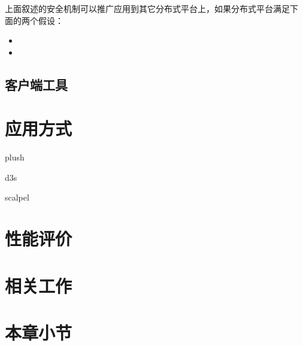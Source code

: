 上面叙述的安全机制可以推广应用到其它分布式平台上，如果分布式平台满足下
面的两个假设：

\begin{itemize}
  \item

  \item
\end{itemize}


\subsection{客户端工具}
\label{subsec:client}

\section{应用方式}
plush

d3s

scalpel

\section{性能评价}

\section{相关工作}

\section{本章小节}

